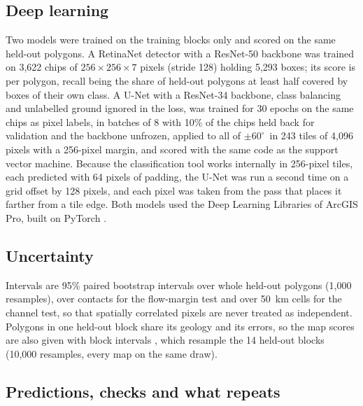 \documentclass[twocolumn]{aastex701}
\newcommand{\pmsixty}{$\pm60^{\circ}$}
\begin{document}
\subsection{Deep learning}

Two models were trained on the training blocks only and scored on the same held-out polygons. A RetinaNet detector
\citep{Lin2017} with a ResNet-50 backbone \citep{He2016} was trained on 3,622 chips of $256\times256\times7$ pixels
(stride 128) holding 5,293 boxes; its score is per polygon, recall being the share of held-out polygons at least half
covered by boxes of their own class. A U-Net \citep{Ronneberger2015} with a ResNet-34 backbone, class balancing and
unlabelled ground ignored in the loss, was trained for 30 epochs on the same chips as pixel labels, in batches of 8
with 10\% of the chips held back for validation and the backbone unfrozen, applied to all of
\pmsixty\ in 243 tiles of 4,096 pixels with a 256-pixel margin, and scored with the same code as the support vector
machine. Because the classification tool works internally in 256-pixel tiles, each predicted with 64 pixels of
padding, the U-Net was run a second time on a grid
offset by 128 pixels, and each pixel was taken from the pass that places it farther from a tile edge. Both models used
the Deep Learning Libraries of ArcGIS Pro, built on PyTorch \citep{Paszke2019}. %

\subsection{Uncertainty}

Intervals are 95\% paired bootstrap intervals \citep{Efron1993} over whole held-out polygons (1,000 resamples), over
contacts for the flow-margin test and over 50~km cells for the channel test, so that spatially correlated pixels are
never treated as independent. Polygons in one held-out block share its geology and its errors, so the map scores are
also given with block intervals \citep{Kunsch1989}, which resample the 14 held-out blocks (10,000 resamples, every map on the same
draw). %

\subsection{Predictions, checks and what repeats} \label{sec:honest}
\end{document}

